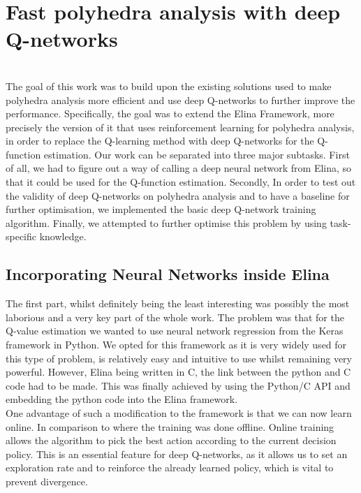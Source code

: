 
\chapter{Fast polyhedra analysis with deep Q-networks}
\mbox{}\\
The goal of this work was to build upon the existing solutions used to make polyhedra analysis more efficient and use deep Q-networks to further improve the performance. Specifically, the goal was to extend the Elina Framework, more precisely the version of it that uses reinforcement learning for polyhedra analysis, in order to replace the Q-learning method with deep Q-networks for the Q-function estimation. Our work can be separated into three major subtasks. First of all, we had to figure out a way of calling a deep neural network from Elina, so that it could be used for the Q-function estimation. Secondly, In order to test out the validity of deep Q-networks on polyhedra analysis and to have a baseline for further optimisation, we implemented the basic deep Q-network training algorithm. Finally, we attempted to further optimise this problem by using task-specific knowledge.

\section{Incorporating Neural Networks inside Elina}
The first part, whilst definitely being the least interesting was possibly the most laborious and a very key part of the whole work. The problem was that for the Q-value estimation we wanted to use neural network regression from the Keras framework in Python. We opted for this framework as it is very widely used for this type of problem, is relatively easy and intuitive to use whilst remaining very powerful. However, Elina being written in C, the link between the python and C code had to be made. This was finally achieved by using the Python/C API and embedding the python code into the Elina framework.\\
One advantage of such a modification to the framework is that we can now learn online. In comparison to \cite{singh2018fast} where the training was done offline. Online training allows the algorithm to pick the best action according to the current decision policy. This is an essential feature for deep Q-networks, as it allows us to set an exploration rate and to reinforce the already learned policy, which is vital to prevent divergence.
